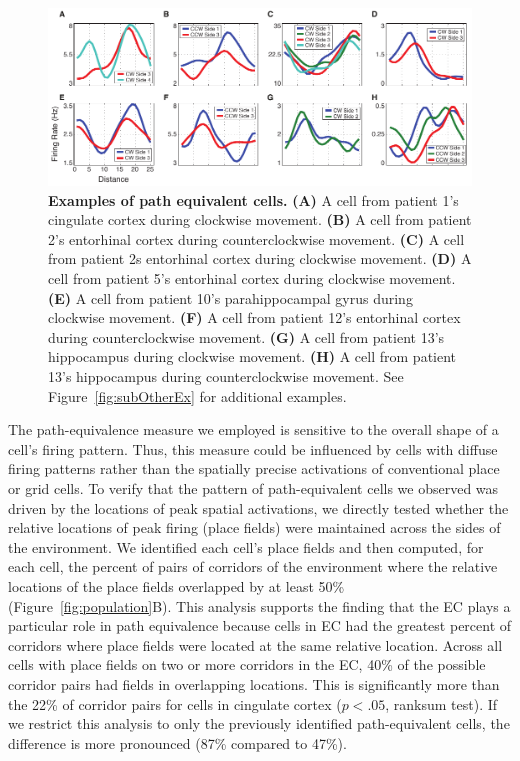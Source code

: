 \begin{figure}[t]
\centering 
\includegraphics[width=.99\textwidth]{./tex/linearGrids/figs/Figure3}
\caption[Examples of path equivalent cells]{\textbf{Examples of path equivalent cells.} \textbf{(A)} A cell from patient 1's cingulate cortex during clockwise movement. \textbf{(B)} A cell from patient 2's entorhinal cortex during counterclockwise movement. \textbf{(C)} A cell from patient 2s entorhinal cortex during clockwise movement. \textbf{(D)} A cell from patient 5's entorhinal cortex during clockwise movement. \textbf{(E)} A cell from patient 10's parahippocampal gyrus during clockwise movement. \textbf{(F)} A cell from patient 12's entorhinal cortex during counterclockwise movement. \textbf{(G)} A cell from patient 13's hippocampus during clockwise movement. \textbf{(H)} A cell from patient 13's hippocampus during counterclockwise movement. See Figure~\ref{fig:subOtherEx} for additional examples.} \label{fig:otherExamples}
\end{figure}


The path-equivalence measure we employed is sensitive to the overall shape of a cell's firing pattern.  Thus, this measure could be influenced by cells with diffuse firing patterns \cite{QuirEtal92} rather than the spatially precise activations  of conventional place or grid cells.  To verify that the pattern of path-equivalent cells we observed was driven by the locations of peak spatial activations, we directly tested whether the relative locations of peak firing  (place fields) were maintained across the sides of the environment. We identified each cell's place fields and then computed, for each cell, the percent of pairs of corridors of the environment where the relative locations of the place fields overlapped by at least 50\% (Figure~\ref{fig:population}B).  This analysis supports  the finding that the EC plays a particular role in path equivalence because cells in EC had the greatest percent of corridors where place fields were located at the same relative location. Across all cells with place fields on two or more corridors in the EC, 40\% of the possible corridor pairs had fields in overlapping locations. This is significantly more than the  22\% of corridor pairs for cells in cingulate cortex ($p<.05$, ranksum test). If we restrict this analysis to only the previously identified path-equivalent cells, the difference is more pronounced (87\% compared to 47\%).


